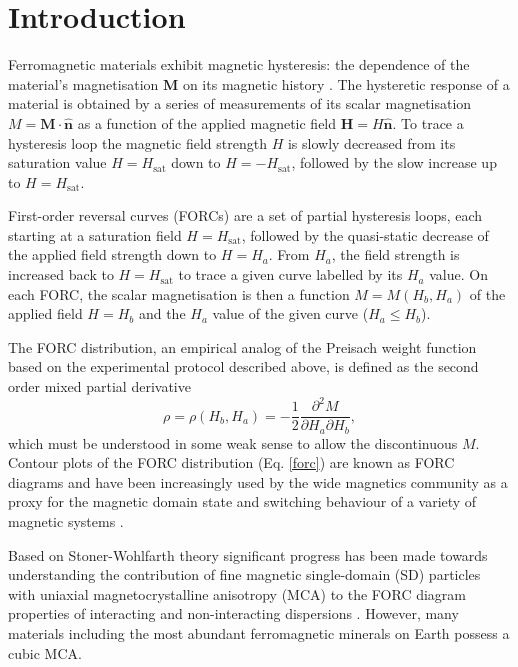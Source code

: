 \section{Introduction}
Ferromagnetic materials exhibit magnetic hysteresis: the dependence of the material's magnetisation $\boldsymbol{M}$ on its magnetic history \citep{Mayergoyz1986}. The hysteretic response of a material is obtained by a series of measurements of its scalar magnetisation $M=\boldsymbol{M} \cdot \boldsymbol{\hat{n}}$ as a function of the applied magnetic field $\boldsymbol{H}=H\boldsymbol{\hat{n}}$. To trace a hysteresis loop the magnetic field strength $H$ is slowly decreased from its saturation value $H=H_{\text{sat}}$ down to $H=-H_{\text{sat}}$, followed by the slow increase up to $H=H_{\text{sat}}$.\par

First-order reversal curves (FORCs) are a set of partial hysteresis loops, each starting at a saturation field $H=H_{\text{sat}}$, followed by the quasi-static decrease of the applied field strength down to $H=H_a$. From $H_a$, the field strength is increased back to $H=H_{\text{sat}}$ to trace a given curve labelled by its $H_a$ value. On each FORC, the scalar magnetisation is then a function $M=M(H_b, H_a)$ of the applied field $H=H_b$ and the $H_a$ value of the given curve ($H_a \leq H_b$).\par
The FORC distribution, an empirical analog of the Preisach weight function based on the experimental protocol described above, is defined as the second order mixed partial derivative \citep{Roberts2000}
\begin{equation}\label{forc}
\rho = \rho(H_b, H_a) = -\frac{1}{2}\frac{\partial^2 M}{\partial H_a \partial H_b},
\end{equation}
which must be understood in some weak sense to allow the discontinuous $M$. Contour plots of the FORC distribution (Eq. \ref{forc}) are known as FORC diagrams and have been increasingly used by the wide magnetics community as a proxy for the magnetic domain state and switching behaviour of a variety of magnetic systems \citep{Pike1999,Pike2005,Roberts2000,Biasi2016,Proenca2017}.\par

Based on Stoner-Wohlfarth theory \citep{Stoner1948} significant progress has been made towards understanding the contribution of fine magnetic single-domain (SD) particles with uniaxial magnetocrystalline anisotropy (MCA) to the FORC diagram properties of interacting and non-interacting dispersions \citep{Newell2005,Egli2010,Biasi2016}. However, many materials including the most abundant ferromagnetic minerals on Earth possess a cubic MCA.\par

